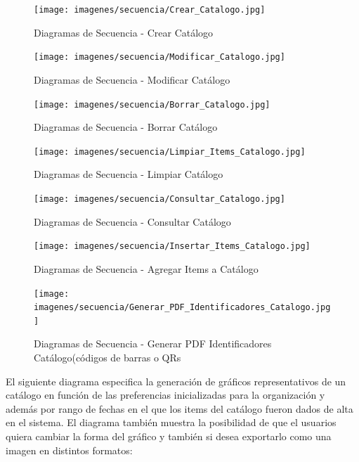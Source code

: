 \documentclass[a4paper,11pt]{book}
\begin{document}
\begin{figure}[H] 
\centering 
\texttt{[image: imagenes/secuencia/Crear\_Catalogo.jpg]}
\caption{ Diagramas de Secuencia - Crear Catálogo\cite{diagrama}  }  
\end{figure}

\begin{figure}[H] 
\centering 
\texttt{[image: imagenes/secuencia/Modificar\_Catalogo.jpg]}
\caption{ Diagramas de Secuencia - Modificar Catálogo\cite{diagrama}  }  
\end{figure}

\begin{figure}[H] 
\centering 
\texttt{[image: imagenes/secuencia/Borrar\_Catalogo.jpg]}
\caption{ Diagramas de Secuencia - Borrar Catálogo\cite{diagrama}  }  
\end{figure}

\begin{figure}[H] 
\centering 
\texttt{[image: imagenes/secuencia/Limpiar\_Items\_Catalogo.jpg]}
\caption{ Diagramas de Secuencia - Limpiar Catálogo\cite{diagrama}  }  
\end{figure}

\begin{figure}[H] 
\centering 
\texttt{[image: imagenes/secuencia/Consultar\_Catalogo.jpg]}
\caption{ Diagramas de Secuencia - Consultar Catálogo\cite{diagrama}  }  
\end{figure}

\begin{figure}[H] 
\centering 
\texttt{[image: imagenes/secuencia/Insertar\_Items\_Catalogo.jpg]}
\caption{ Diagramas de Secuencia - Agregar Items a Catálogo\cite{diagrama}  }  
\end{figure}

\begin{figure}[H] 
\centering 
\texttt{[image: imagenes/secuencia/Generar\_PDF\_Identificadores\_Catalogo.jpg]}
\caption{ Diagramas de Secuencia - Generar PDF Identificadores Catálogo(códigos de barras o QRs\cite{diagrama}  }  
\end{figure}

El siguiente diagrama especifica la generación de gráficos representativos de un catálogo en función de las preferencias inicializadas para la organización y además por rango de fechas en el que los items del catálogo fueron dados de alta en el sistema. El diagrama también muestra la posibilidad de que el usuarios quiera cambiar la forma del gráfico y también si desea exportarlo como una imagen en distintos formatos:
\end{document}
